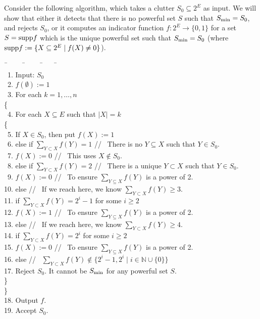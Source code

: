 \documentclass[12pt]{article}
\newcommand{\supp}{\hbox{\rm supp}}
\def\pf{\noindent {\it Proof.\ }}
\begin{document}
\pf Consider the following algorithm, which takes a clutter $S_0\subseteq2^E$ as input.
We will show that either it detects that there is no powerful set $S$ such that
$S_{\scriptsize\hbox{min}}=S_0$, and rejects $S_0$, or it computes an indicator function
$f:2^E\rightarrow\{0,1\}$ for a set $S=\supp f$ which is the unique powerful set
such that $S_{\scriptsize\hbox{min}}=S_0$ (where $\supp f := \{X\subseteq2^E\mid f(X)\not=0\}$).
\begin{tabbing}
\renewcommand{\baselinestretch}{3.0}
\hspace*{1cm}\=\ \ \ \ \ \=\ \ \ \ \ \=\ \ \ \ \ \=\hspace{1.8in}\=   \\
~1.  \>  Input:  $S_0$   \\
~2.  \>  $f(\emptyset) := 1$   \\
~3.  \>  For each $k=1,\ldots,n$   \\
     \>  \{   \\
~4.  \>  \>  For each $X\subseteq E$ such that $|X|=k$   \\
     \>  \>  \{   \\
~5.  \>  \>  \>  If  $X\in S_0$, then put $f(X) := 1$   \\
~6.  \>  \>  \>  else if  $\sum_{Y\subset X} f(Y) = 1$   \>  \>  //~   There is no $Y\subseteq X$ such that $Y\in S_0$.   \\[5pt]
~7.  \>  \>  \>  \>  $f(X) := 0$      \>  //~   This uses $X\not\in S_0$.   \\[5pt]
~8.  \>  \>  \>  else if  $\sum_{Y\subset X} f(Y) = 2$   \>  \>  //~   There is a unique $Y\subset X$ such that $Y\in S_0$.   \\[5pt]
~9.  \>  \>  \>  \>  $f(X) := 0$   \>  //~   To ensure $\sum_{Y\subseteq X} f(Y)$ is a power of 2.   \\[5pt]
10.  \>  \>  \>  else  \>  \>  //~   If we reach here, we know $\sum_{Y\subset X} f(Y)\ge3$.   \\
11.  \>  \>  \>  if $\sum_{Y\subset X} f(Y) = 2^i-1$ for some $i\ge2$   \\[5pt]
12.  \>  \>  \>  \>  $f(X) := 1$   \>  //~   To ensure $\sum_{Y\subseteq X} f(Y)$ is a power of 2.   \\[5pt]
13.  \>  \>  \>  else  \>  \>  //~   If we reach here, we know $\sum_{Y\subset X} f(Y)\ge4$.   \\
14.  \>  \>  \>  if $\sum_{Y\subset X} f(Y) = 2^i$ for some $i\ge2$   \\[5pt]
15.  \>  \>  \>  \>  $f(X) := 0$   \>  //~   To ensure $\sum_{Y\subseteq X} f(Y)$ is a power of 2.   \\[5pt]
16.  \>  \>  \>  else   \>  \>  //~   $\sum_{Y\subset X} f(Y)\not\in\{2^i-1,2^i\mid i\in\mathbb{N}\cup\{0\}\}$   \\[5pt]
17.  \>  \>  \>  \>  Reject $S_0$.  It cannot be $S_{\scriptsize\hbox{min}}$ for any powerful set $S$.   \\[5pt]
  \>  \>  \}   \\
  \>  \}   \\
18.  \>  Output $f$.   \\
19.  \>  Accept $S_0$.
\end{tabbing}
\end{document}
